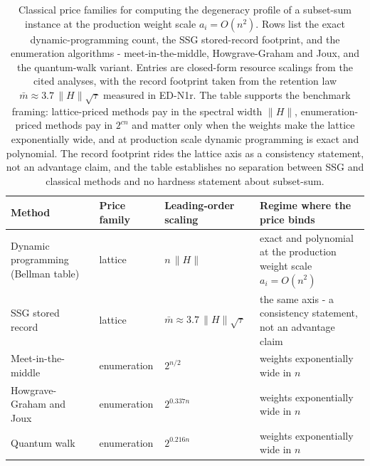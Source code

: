 \begin{table}[t]
\caption{Classical price families for computing the degeneracy profile of a subset-sum instance at the production weight scale $a_i = O(n^{2})$. Rows list the exact dynamic-programming count, the SSG stored-record footprint, and the enumeration algorithms - meet-in-the-middle, Howgrave-Graham and Joux, and the quantum-walk variant. Entries are closed-form resource scalings from the cited analyses, with the record footprint taken from the retention law $\bar m \approx 3.7\,\|H\|\sqrt{\tau}$ measured in ED-N1r. The table supports the benchmark framing: lattice-priced methods pay in the spectral width $\|H\|$, enumeration-priced methods pay in $2^{cn}$ and matter only when the weights make the lattice exponentially wide, and at production scale dynamic programming is exact and polynomial. The record footprint rides the lattice axis as a consistency statement, not an advantage claim, and the table establishes no separation between SSG and classical methods and no hardness statement about subset-sum.}
\label{tab:dp-price}
\begin{ruledtabular}
\begin{tabular}{llll}
\textbf{Method} & \textbf{Price family} & \textbf{Leading-order scaling} & \textbf{Regime where the price binds} \\ \hline
Dynamic programming (Bellman table) & lattice & $n\,\|H\|$ & exact and polynomial at the production weight scale $a_i = O(n^2)$ \\
SSG stored record & lattice & $\bar m \approx 3.7\,\|H\|\sqrt{\tau}$ & the same axis - a consistency statement, not an advantage claim \\
Meet-in-the-middle & enumeration & $2^{n/2}$ & weights exponentially wide in $n$ \\
Howgrave-Graham and Joux & enumeration & $2^{0.337n}$ & weights exponentially wide in $n$ \\
Quantum walk & enumeration & $2^{0.216n}$ & weights exponentially wide in $n$ \\
\end{tabular}
\end{ruledtabular}
\end{table}

